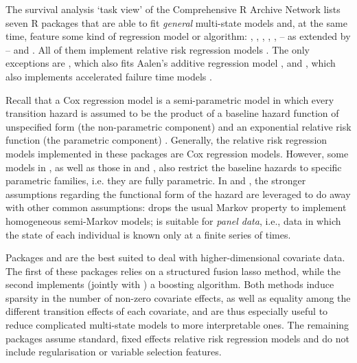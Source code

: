 The survival analysis `task view' of the Comprehensive R Archive Network lists seven
R packages that are able to fit \textit{general} multi-state models and, at the same time, feature some kind of regression model or algorithm:  \citep{flexsurv_package},  \citep{Jackson2011},  \citep{Listwon2015},  \citep{survival_package},  \citep{Wreede2010},  \citep{mboost_package} -- as extended by  \citep{gamboostMSM_package} -- and   \citep{penMSM_package}. All of them implement relative risk regression models \citep[as defined in][p. 133]{Aalen2008}. The only exceptions are , which also fits Aalen's additive regression model \citep{Aalen1989}, and , which also implements accelerated failure time models . 

Recall that a Cox regression model is a semi-parametric model in which every transition hazard is assumed to be the product of a baseline hazard function of unspecified form (the non-parametric component) and an exponential relative risk function (the parametric component) \citep[][p. 133]{Aalen2008}. 
Generally, the relative risk regression models implemented in these packages are Cox regression models. However, some models in , as well as those in  and , also restrict the baseline hazards to specific parametric families, i.e. they are fully parametric. In  and , the stronger assumptions regarding the functional form of the hazard are leveraged to do away with other common assumptions:  drops the usual Markov property to implement homogeneous semi-Markov models;  is suitable for \textit{panel data}, i.e., data in which the state of each individual is known only at a finite series of times. 

Packages  and  are the best suited to deal with higher-dimensional covariate data. 
The first of these packages relies on a structured fusion lasso method, while the second implements (jointly with ) a boosting algorithm. Both methods induce sparsity in the number of non-zero covariate effects, as well as equality among the different transition effects of each covariate, and are thus especially useful to reduce complicated multi-state models to more interpretable ones. The remaining packages assume standard, fixed effects relative risk regression models and do not include regularisation or variable selection features.


